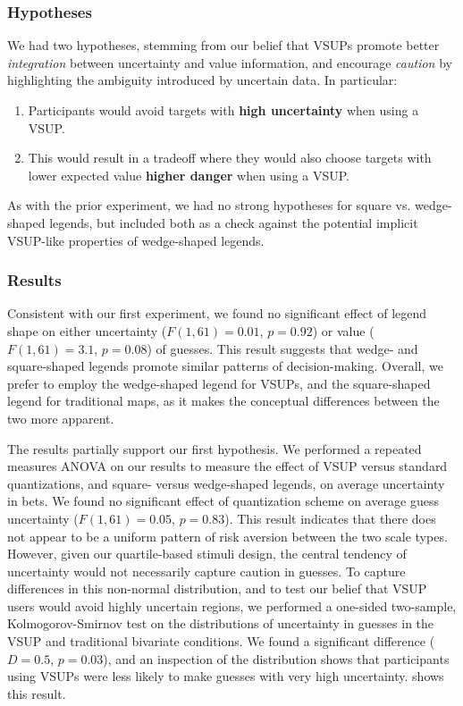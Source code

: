 \subsubsection{Hypotheses}

We had two hypotheses, stemming from our belief that VSUPs promote better \emph{integration} between uncertainty and value information, and encourage \emph{caution} by highlighting the ambiguity introduced by uncertain data. In particular:
\begin{enumerate}
	\item Participants would avoid targets with \textbf{high uncertainty} when using a VSUP.
	\item This would result in a tradeoff where they would also choose targets with lower expected value \textbf{higher danger} when using a VSUP.
\end{enumerate}

As with the prior experiment, we had no strong hypotheses for square vs. wedge-shaped legends, but included both as a check against the potential implicit VSUP-like properties of wedge-shaped legends.

\subsubsection{Results} 
\taskTwoHeatmap

Consistent with our first experiment, we found no significant effect of legend shape on either uncertainty ($F(1,61) = 0.01$, $p=0.92$) or value ($F(1,61)=3.1$, $p=0.08$) of guesses. This result suggests that wedge- and square-shaped legends promote similar patterns of decision-making. Overall, we prefer to employ the wedge-shaped legend for VSUPs, and the square-shaped legend for traditional maps, as it makes the conceptual differences between the two more apparent.

The results partially support our first hypothesis. We performed a repeated measures ANOVA on our results to measure the effect of VSUP versus standard quantizations, and square- versus wedge-shaped legends, on average uncertainty in bets. We found no significant effect of quantization scheme on average guess uncertainty ($F(1,61)=0.05$, $p=0.83$). This result indicates that there does not appear to be a uniform pattern of risk aversion between the two scale types. However, given our quartile-based stimuli design, the central tendency of uncertainty would not necessarily capture caution in guesses. To capture differences in this non-normal distribution, and to test our belief that VSUP users would avoid highly uncertain regions, we performed a one-sided two-sample, Kolmogorov-Smirnov test on the distributions of uncertainty in guesses in the VSUP and traditional bivariate conditions. We found a significant difference ($D = 0.5$, $p=0.03$), and an inspection of the distribution shows that participants using VSUPs were less likely to make guesses with very high uncertainty.  shows this result.

